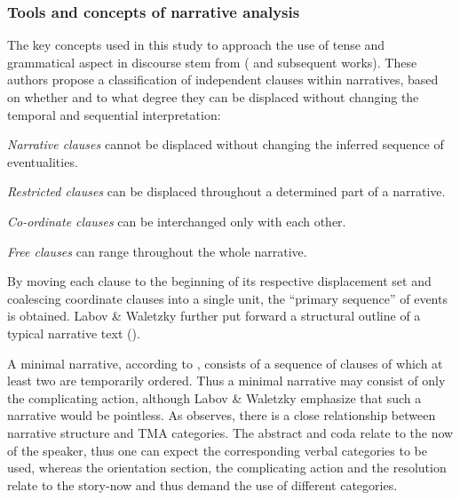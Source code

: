 \subsubsection{Tools and concepts of narrative analysis}\label{ToolsNarrativeAnalysis} 
The key concepts used in this study to approach the use of tense and grammatical aspect in discourse stem from \citeauthor{LabovWWaletzkyJ1967} (\citeyear{LabovWWaletzkyJ1967} and subsequent works). These authors propose a classification of independent clauses within narratives, based on whether and to what degree they can be displaced without changing the temporal and sequential interpretation:
\begin{compactitem}
\item \textit{Narrative clauses} cannot be displaced without changing the inferred sequence of eventualities.
\item \textit{Restricted clauses} can be displaced throughout a determined part of a narrative.
\item \textit{Co-ordinate clauses} can be interchanged only with each other.
\item \textit{Free clauses} can range throughout the whole narrative.
\end{compactitem}

By moving each clause to the beginning of its respective displacement set and coalescing coordinate clauses into a single unit, the ``primary sequence'' of events is obtained. Labov \& Waletzky further put forward a structural outline of a typical narrative text ().

A minimal narrative, according to \citet{LabovWWaletzkyJ1967}, consists of a sequence of clauses of which at least two are temporarily ordered. Thus a minimal narrative may consist of only the complicating action, although Labov \& Waletzky emphasize that such a narrative would be pointless.
As \citet[136]{FleischmanS1990} observes, there is a close relationship between narrative structure and TMA categories. The abstract and coda relate to the now of the speaker, thus one can expect the corresponding verbal categories to be used, whereas the orientation section, the complicating action and the resolution relate to the story-now and thus demand the use of different categories.


